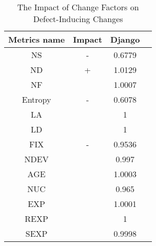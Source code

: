 \documentclass[10pt, conference]{IEEEtran}
\begin{document}
\begin{table}
	\centering
	\caption{The Impact of Change Factors on Defect-Inducing Changes}
	\begin{tabular}{|c|c|c|c|}
		\hline Metrics name & Impact & Django \\ 
		\hline NS & - & 0.6779 \\ 
		\hline ND & + & 1.0129 \\ 
		\hline NF &  & 1.0007 \\ 
		\hline Entropy & - & 0.6078 \\ 
		\hline LA &  & 1 \\ 
		\hline LD &  & 1 \\ 
		\hline FIX & - & 0.9536 \\ 
		\hline NDEV &  & 0.997 \\ 
		\hline AGE &  & 1.0003 \\ 
		\hline NUC &  & 0.965 \\ 
		\hline EXP &  & 1.0001 \\ 
		\hline REXP &  & 1 \\ 
		\hline SEXP &  & 0.9998 \\ 
		\hline 
	\end{tabular}
	\label{table:odds_ratio}  
\end{table}
\end{document}
